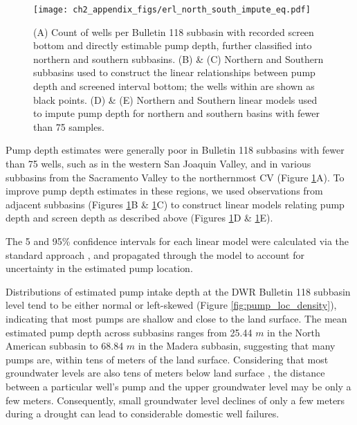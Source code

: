 \begin{figure}[ht]
	\texttt{[image: ch2\_appendix\_figs/erl\_north\_south\_impute\_eq.pdf]}
	\caption{(A) Count of wells per Bulletin 118 subbasin with recorded screen bottom and directly estimable pump depth, further classified into northern and southern subbasins. (B) \& (C) Northern and Southern subbasins used to construct the linear relationships between pump depth and screened interval bottom; the wells within are shown as black points. (D) \& (E) Northern and Southern linear models used to impute pump depth for northern and southern basins with fewer than 75 samples.}
	\label{fig:north_south_impute}
\end{figure}

Pump depth estimates were generally poor in Bulletin 118 subbasins with fewer than 75 wells, such as in the western San Joaquin Valley, and in various subbasins from the Sacramento Valley to the northernmost CV (Figure \ref{fig:north_south_impute}A). To improve pump depth estimates in these regions, we used observations from adjacent subbasins (Figures \ref{fig:north_south_impute}B \&  \ref{fig:north_south_impute}C) to construct linear models relating pump depth and screen depth as described above (Figures \ref{fig:north_south_impute}D \&  \ref{fig:north_south_impute}E).  

The 5 and 95\% confidence intervals for each linear model were calculated via the standard approach \cite{james2013introduction}, and propagated through the model to account for uncertainty in the estimated pump location.   


Distributions of estimated pump intake depth at the DWR Bulletin 118 subbasin level tend to be either normal or left-skewed (Figure \ref{fig:pump_loc_density}), indicating that most pumps are shallow and close to the land surface. The mean estimated pump depth across subbasins ranges from 25.44 $m$ in the North American subbasin to 68.84 $m$ in the Madera subbasin, suggesting that many pumps are, within tens of meters of the land surface. Considering that most groundwater levels are also tens of meters below land surface %
, the distance between a particular well's pump and the upper groundwater level may be only a few meters. Consequently, small groundwater level declines of only a few meters during a drought can lead to considerable domestic well failures.  

